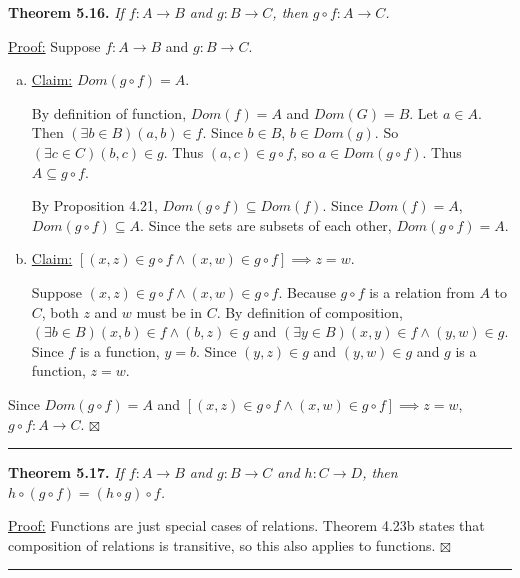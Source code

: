 \documentclass[a4paper,12pt]{article}
\newcommand{\entry}[3]
{
   \noindent\textbf{#1.}
   \emph{#2}
   \bigskip

   \noindent#3
   \bigskip
   \hrule
   \vspace{24pt}
}
\newcommand{\sig}{$\boxtimes$}
\begin{document}
\entry{Theorem 5.16}
{If $f : A \to B$ and $g : B \to C$, then $g \circ f : A \to C$.}
{
\underline{Proof:} Suppose $f : A \to B$ and $g : B \to C$.
\begin{enumerate}[(a)]
\item
\underline{Claim:} $Dom(g \circ f) = A$.

By definition of function, $Dom(f) = A$ and $Dom(G) = B$. Let $a \in A$. Then $(\exists b \in B) (a, b) \in f$. Since $b \in B$, $b \in Dom(g)$. So $(\exists c \in C) (b, c) \in g$. Thus $(a, c) \in g \circ f$, so $a \in Dom(g \circ f)$. Thus $A \subseteq g \circ f$.

By Proposition 4.21, $Dom(g \circ f) \subseteq Dom(f)$. Since $Dom(f) = A$, $Dom(g \circ f) \subseteq A$. Since the sets are subsets of each other, $Dom(g \circ f) = A$.
\item
\underline{Claim:} $[ (x, z) \in g \circ f \land (x, w) \in g \circ f ] \implies z = w$.

Suppose $(x, z) \in g \circ f \land (x, w) \in g \circ f$. Because $g \circ f$ is a relation from $A$ to $C$, both $z$ and $w$ must be in $C$. By definition of composition, $(\exists b \in B) (x, b) \in f \land (b, z) \in g$ and $(\exists y \in B) (x, y) \in f \land (y, w) \in g$. Since $f$ is a function, $y = b$. Since $(y, z) \in g$ and $(y, w) \in g$ and $g$ is a function, $z = w$.
\end{enumerate}
Since $Dom(g \circ f) = A$ and $[ (x, z) \in g \circ f \land (x, w) \in g \circ f ] \implies z = w$, $g \circ f : A \to C$. \sig
}



\entry{Theorem 5.17}
{If $f : A \to B$ and $g : B \to C$ and $h : C \to D$, then $h \circ (g \circ f) = (h \circ g) \circ f$.}
{
\underline{Proof:} Functions are just special cases of relations. Theorem 4.23b states that composition of relations is transitive, so this also applies to functions. \sig
}
\end{document}
